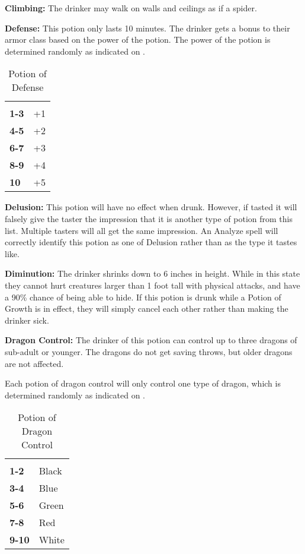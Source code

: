 \begin{multicols*}{2}
\textbf{Climbing:} The drinker may walk on walls and ceilings as if a spider.

\textbf{Defense:} This potion only lasts 10 minutes. The drinker gets a bonus to their armor class based on the power of the potion. The power of the potion is determined randomly as indicated on .

\begin {table}[H]
  \caption{Potion of Defense}\label{tab:Potion of Defense}
  \begin{tabularx}{\columnwidth}{>{\bfseries}YY}
	 & \\
	1-3 & +1\\
	4-5 & +2\\
	6-7 & +3\\
	8-9 & +4\\
	10 & +5
  \end {tabularx}
\end {table}

\textbf{Delusion:} This potion will have no effect when drunk. However, if tasted it will falsely give the taster the impression that it is another type of potion from this list. Multiple tasters will all get the same impression. An Analyze spell will correctly identify this potion as one of Delusion rather than as the type it tastes like.

\textbf{Diminution:} The drinker shrinks down to 6 inches in height. While in this state they cannot hurt creatures larger than 1 foot tall with physical attacks, and have a 90\% chance of being able to hide. If this potion is drunk while a Potion of Growth is in effect, they will simply cancel each other rather than making the drinker sick.

\textbf{Dragon Control:} The drinker of this potion can control up to three dragons of sub-adult or younger. The dragons do not get saving throws, but older dragons are not affected.

Each potion of dragon control will only control one type of dragon, which is determined randomly as indicated on .

\begin {table}[H]
  \caption{Potion of Dragon Control}\label{tab:Potion of Dragon Control}
  \begin{tabularx}{\columnwidth}{>{\bfseries}YY}
	 & \\
	1-2 & Black\\
	3-4 & Blue\\
	5-6 & Green\\
	7-8 & Red\\
	9-10 & White
  \end {tabularx}
\end {table}


\end{multicols*}
